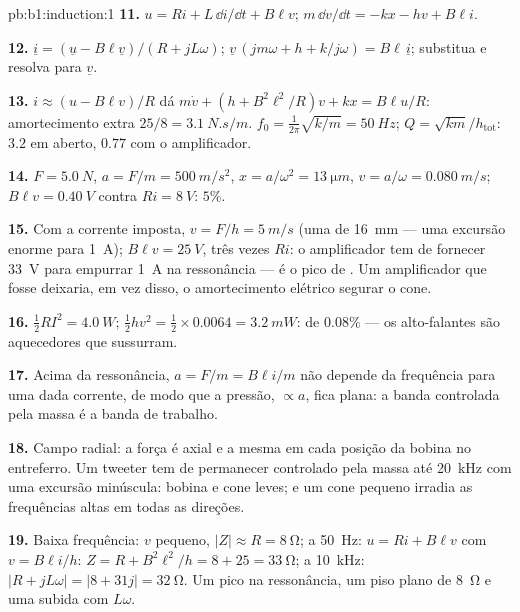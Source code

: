 \begin{solution}{pb:b1:induction:1}
\textbf{11.} $u = Ri + L\,\dd i/\dd t + B\ell v$; $m\,\dd v/\dd t = -kx - hv + B\ell i$.

\textbf{12.} $\underline i = (\underline u - B\ell\underline v)/(R + jL\omega)$; $\underline v\,(jm\omega + h +
k/j\omega) = B\ell\,\underline i$; substitua e resolva para $\underline v$.

\textbf{13.} $i \approx (u - B\ell v)/R$ dá $m\dot v + (h + B^2\ell^2/R)v + kx =
B\ell u/R$: amortecimento extra $25/8 = \qty{3.1}{N.s/m}$. $f_0 = \tfrac1{2\pi}\sqrt{k/m} =
\qty{50}{Hz}$; $Q = \sqrt{km}/h_{\text{tot}}$: $3.2$ em aberto, $0.77$ com o
amplificador.

\textbf{14.} $F = \qty{5.0}{N}$, $a = F/m = \qty{500}{m/s^2}$, $x = a/\omega^2 =
\qty{13}{\micro m}$, $v = a/\omega = \qty{0.080}{m/s}$; $B\ell v = \qty{0.40}{V}$ contra
$Ri = \qty{8}{V}$: $5\%$.

\textbf{15.} Com a corrente imposta, $v = F/h = \qty{5}{m/s}$ (uma
 de \qty{16}{mm} --- uma excursão enorme para \qty{1}{A}); $B\ell v =
\qty{25}{V}$, três vezes $Ri$: o amplificador tem de fornecer \qty{33}{V} para empurrar
\qty{1}{A} na ressonância --- é o pico de . Um amplificador que fosse 
deixaria, em vez disso, o amortecimento elétrico segurar o cone.

\textbf{16.} $\tfrac12RI^2 = \qty{4.0}{W}$; $\tfrac12hv^2 = \tfrac12 \times 0.0064 =
\qty{3.2}{mW}$:  de $0.08\%$ --- os alto-falantes são aquecedores que
sussurram.

\textbf{17.} Acima da ressonância, $a = F/m = B\ell i/m$ não depende da
frequência para uma dada corrente, de modo que a pressão, $\propto a$, fica plana:
a banda controlada pela massa é a banda de trabalho.

\textbf{18.} Campo radial: a força é axial e a mesma em cada
posição da bobina no entreferro. Um tweeter tem de permanecer controlado pela massa
até \qty{20}{kHz} com uma excursão minúscula: bobina e cone leves; e um
cone pequeno irradia as frequências altas em todas as direções.

\textbf{19.} Baixa frequência: $v$ pequeno, $|Z| \approx R = \qty{8}{\ohm}$; a
\qty{50}{Hz}: $u = Ri + B\ell v$ com $v = B\ell i/h$: $Z = R + B^2\ell^2/h = 8 + 25 =
\qty{33}{\ohm}$; a \qty{10}{kHz}: $|R + jL\omega| = |8 + 31j| = \qty{32}{\ohm}$. Um
pico na ressonância, um piso plano de \qty{8}{\ohm} e uma subida com $L\omega$.


\end{solution}
